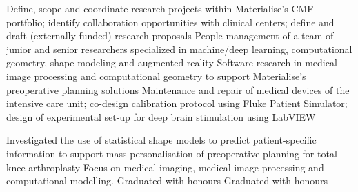 \documentclass[
	a4paper,
	sidesectionsize=Large,
	maincolor=cvgreen,
	sectioncolor=cvgreen,
	topbottommargin=0.02\paperheight,
	leftrightmargin=0.02\paperwidth,
	profilepiczoom=1.6,
	profilepicxshift=-1mm,
	profilepicyshift=-7mm,
	profilepicrounding=0.5cm,
]{fortysecondscv}
\begin{document}
\makefrontsidebar
\newlength{\firstpagespacing}
\setlength{\firstpagespacing}{4ex}

\vspace{\firstpagespacing}
\vspace*{-1ex}
\begin{cvtable}[3.5]
	{Define, scope and coordinate research projects within Materialise's CMF portfolio; identify collaboration opportunities with clinical centers; define and draft (externally funded) research proposals}
	{People management of a team of junior and senior researchers specialized in machine/deep learning, computational geometry, shape modeling and augmented reality}
	{Software research in medical image processing and computational geometry to support Materialise's preoperative planning solutions}
	{Maintenance and repair of medical devices of the intensive care unit; co-design calibration protocol using Fluke Patient Simulator; design of experimental set-up for deep brain stimulation using LabVIEW}
\end{cvtable}

\vspace{\firstpagespacing}
\vspace*{-1ex}
\begin{cvtable}[3.5]	
	{Investigated the use of statistical shape models to predict patient-specific information to support mass personalisation of preoperative planning for total knee arthroplasty}
		{Focus on medical imaging, medical image processing and computational modelling. Graduated with honours}
		{Graduated with honours}
\end{cvtable}
\end{document}
